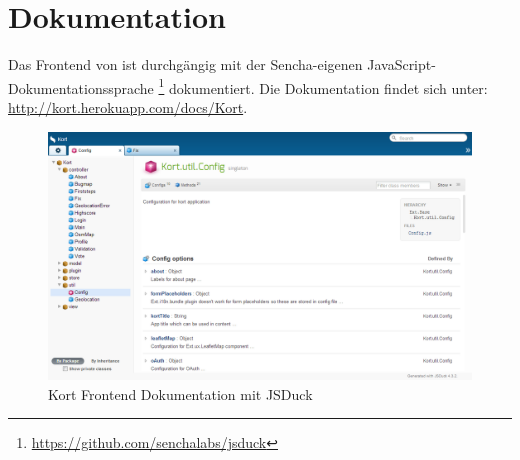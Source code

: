 \section{Dokumentation}

Das Frontend von \kort{} ist durchgängig mit der Sencha-eigenen JavaScript-Dokumentationssprache \footnote{\url{https://github.com/senchalabs/jsduck}} dokumentiert.
Die Dokumentation findet sich unter: \url{http://kort.herokuapp.com/docs/Kort}.

\begin{figure}[H]
	\centering
	\includegraphics[width=\textwidth]{images/implementation/frontend/kort-documentation}
	\caption{Kort Frontend Dokumentation mit JSDuck}
	\label{image-kort-documentation}
\end{figure}